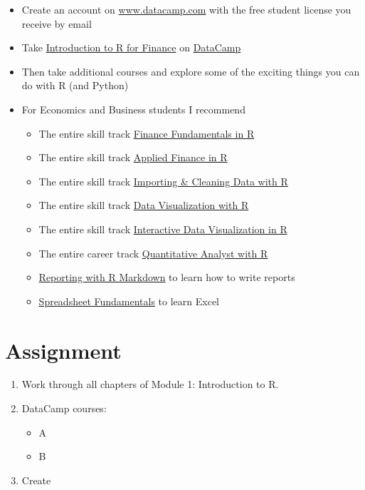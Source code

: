 \documentclass[
]{book}
\providecommand{\tightlist}{%
  \setlength{\itemsep}{0pt}\setlength{\parskip}{0pt}}
\begin{document}
\begin{itemize}
\item
  Create an account on \href{https://www.datacamp.com}{www.datacamp.com} with the free student license you receive by email
\item
  Take \href{https://learn.datacamp.com/courses/introduction-to-r-for-finance}{Introduction to R for Finance} on \href{https://www.datacamp.com}{DataCamp}
\item
  Then take additional courses and explore some of the exciting things you can do with R (and Python)
\item
  For Economics and Business students I recommend

  \begin{itemize}
  \tightlist
  \item
    The entire skill track \href{https://learn.datacamp.com/skill-tracks/finance-fundamentals-in-r}{Finance Fundamentals in R}
  \item
    The entire skill track \href{https://learn.datacamp.com/skill-tracks/applied-finance-in-r}{Applied Finance in R}
  \item
    The entire skill track \href{https://learn.datacamp.com/skill-tracks/importing-cleaning-data-with-r}{Importing \& Cleaning Data with R}
  \item
    The entire skill track \href{https://learn.datacamp.com/skill-tracks/data-visualization-with-r}{Data Visualization with R}
  \item
    The entire skill track \href{https://learn.datacamp.com/skill-tracks/interactive-data-visualization-in-r}{Interactive Data Visualization in R}
  \item
    The entire career track \href{https://learn.datacamp.com/career-tracks/quantitative-analyst-with-r}{Quantitative Analyst with R}
  \item
    \href{https://learn.datacamp.com/courses/reporting-with-rmarkdown}{Reporting with R Markdown} to learn how to write reports
  \item
    \href{https://learn.datacamp.com/skill-tracks/spreadsheet-fundamentals}{Spreadsheet Fundamentals} to learn Excel
  \end{itemize}
\end{itemize}

\hypertarget{assignment}{%
\chapter{Assignment}\label{assignment}}

\begin{enumerate}
\def\labelenumi{\arabic{enumi}.}
\item
  Work through all chapters of Module 1: Introduction to R.
\item
  DataCamp courses:

  \begin{itemize}
  \tightlist
  \item
    A
  \item
    B
  \end{itemize}
\item
  Create
\end{enumerate}

  
\end{document}
